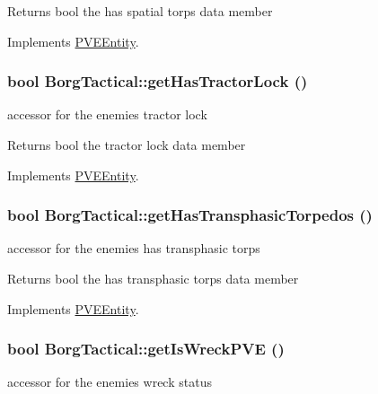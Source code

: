 \begin{DoxyReturn}{Returns}
bool the has spatial torps data member 
\end{DoxyReturn}


Implements \hyperlink{classPVEEntity}{PVEEntity}.

\hypertarget{classBorgTactical_aa9757380ba5e1f4968fd7a817c464bae}{
\subsubsection[{getHasTractorLock}]{\setlength{\rightskip}{0pt plus 5cm}bool BorgTactical::getHasTractorLock ()}}
\label{d0/d4e/classBorgTactical_aa9757380ba5e1f4968fd7a817c464bae}
accessor for the enemies tractor lock

\begin{DoxyReturn}{Returns}
bool the tractor lock data member 
\end{DoxyReturn}


Implements \hyperlink{classPVEEntity}{PVEEntity}.

\hypertarget{classBorgTactical_a6e551bf387d323403ec3101a97f69501}{
\subsubsection[{getHasTransphasicTorpedos}]{\setlength{\rightskip}{0pt plus 5cm}bool BorgTactical::getHasTransphasicTorpedos ()}}
\label{d0/d4e/classBorgTactical_a6e551bf387d323403ec3101a97f69501}
accessor for the enemies has transphasic torps

\begin{DoxyReturn}{Returns}
bool the has transphasic torps data member 
\end{DoxyReturn}


Implements \hyperlink{classPVEEntity}{PVEEntity}.

\hypertarget{classBorgTactical_af53bed854ce027b8e657fa58f8cbda9a}{
\subsubsection[{getIsWreckPVE}]{\setlength{\rightskip}{0pt plus 5cm}bool BorgTactical::getIsWreckPVE ()}}
\label{d0/d4e/classBorgTactical_af53bed854ce027b8e657fa58f8cbda9a}
accessor for the enemies wreck status

